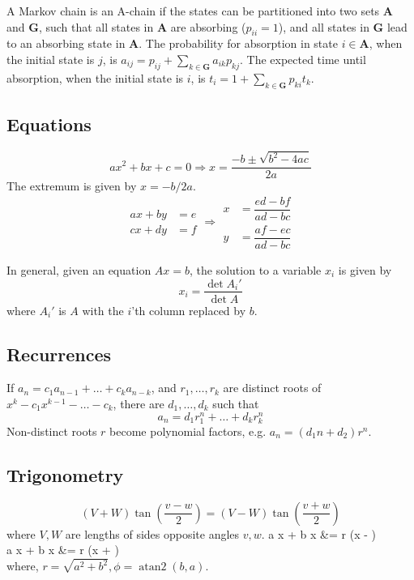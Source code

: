 \documentclass[a4paper,11pt,oneside]{article}
\begin{document}
\begin{multicols*}{\COLS}
A Markov chain is an A-chain if the states can be partitioned into two sets $\mathbf{A}$ and $\mathbf{G}$, such that all states in $\mathbf{A}$ are absorbing ($p_{ii}=1$), and all states in $\mathbf{G}$ lead to an absorbing state in $\mathbf{A}$. The probability for absorption in state $i \in \mathbf{A}$, when the initial state is $j$, is $a_{ij} = p_{ij} + \sum_{k \in \mathbf{G}} a_{ik} p_{kj}$. The expected time until absorption, when the initial state is $i$, is $t_i = 1 + \sum_{k \in \mathbf{G}} p_{ki} t_k$.

\subsection{\small Equations}
\[
ax^2 + bx + c = 0 \Rightarrow x = \frac{-b \pm \sqrt{b^2 - 4ac}}{2a}
\]
The extremum is given by $x = -b / 2a$.
\[
\begin{aligned}
ax + by &= e \\
cx + dy &= f
\end{aligned}
\Rightarrow
\begin{aligned}
x &= \dfrac{ed - bf}{ad - bc} \\
y &= \dfrac{af - ec}{ad - bc}
\end{aligned}
\]

In general, given an equation $Ax = b$, the solution to a variable $x_i$ is given by
\[
x_i = \frac{\det A_i'}{\det A}
\]
where $A_i'$ is $A$ with the $i$'th column replaced by $b$.

\subsection{\small Recurrences}
If $a_n = c_1 a_{n-1} + \dots + c_k a_{n-k}$, and $r_1, \dots, r_k$ are distinct roots of $x^k - c_1 x^{k-1} - \dots - c_k$, there are $d_1, \dots, d_k$ such that
\[
a_n = d_1 r_1^n + \dots + d_k r_k^n
\]
Non-distinct roots $r$ become polynomial factors, e.g. $a_n = (d_1 n + d_2) r^n$.

\subsection{\small Trigonometry}
\[
(V + W) \tan \left( \frac{v - w}{2} \right) = (V - W) \tan \left( \frac{v + w}{2} \right)
\]
where $V, W$ are lengths of sides opposite angles $v, w$.
a \cos x + b \sin x &= r \cos(x - \phi)\\
a \sin x + b \cos x &= r \sin(x + \phi) \\ 
where, $r = \sqrt{a^2 + b^2},  \phi = \operatorname{atan2}(b, a)$.


\end{multicols*}
\end{document}
